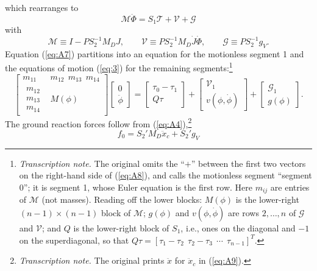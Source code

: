 \documentclass[11pt]{article}
\newcommand{\tnote}[1]{\footnote{\textit{Transcription note.} #1}}
\begin{document}
which rearranges to
\begin{equation}
\mathcal{M}\ddot{\Phi} = S_1\mathcal{T} + \mathcal{V} + \mathcal{G}
\label{eq:A7}
\end{equation}
with
\[
\mathcal{M} \equiv I - P S_2^{-1} M_D J, \qquad
\mathcal{V} \equiv P S_2^{-1} M_D\dot{J}\dot{\Phi}, \qquad
\mathcal{G} \equiv P S_2^{-1} g_V.
\]
Equation (\ref{eq:A7}) partitions into an equation for the motionless segment
1 and the equations of motion (\ref{eq:3}) for the remaining
segments:\tnote{The original omits the ``$+$'' between the first two vectors
on the right-hand side of (\ref{eq:A8}), and calls the motionless segment
``segment 0''; it is segment 1, whose Euler equation is the first row. Here
$m_{ij}$ are entries of $\mathcal{M}$ (not masses). Reading off the lower
blocks: $M(\phi)$ is the lower-right $(n-1)\times(n-1)$ block of
$\mathcal{M}$; $g(\phi)$ and $v(\phi,\dot{\phi})$ are rows $2,\ldots,n$ of
$\mathcal{G}$ and $\mathcal{V}$; and $Q$ is the lower-right block of $S_1$,
i.e., ones on the diagonal and $-1$ on the superdiagonal, so that
$Q\tau=[\tau_1-\tau_2\ \ \tau_2-\tau_3\ \ \cdots\ \ \tau_{n-1}]^T$.}
\begin{equation}
\begin{bmatrix}
m_{11} & m_{12}\ \ m_{13}\ \ m_{14}\\
\begin{matrix}m_{12}\\ m_{13}\\ m_{14}\end{matrix} & M(\phi)
\end{bmatrix}
\begin{bmatrix}0\\ \ddot{\phi}\end{bmatrix}
= \begin{bmatrix}\tau_0 - \tau_1\\ Q\tau\end{bmatrix}
+ \begin{bmatrix}\mathcal{V}_1\\ v(\phi,\dot{\phi})\end{bmatrix}
+ \begin{bmatrix}\mathcal{G}_1\\ g(\phi)\end{bmatrix}.
\label{eq:A8}
\end{equation}
The ground reaction forces follow from (\ref{eq:A4}),\tnote{The original
prints $\ddot{x}$ for $\ddot{x}_c$ in (\ref{eq:A9}).}
\begin{equation}
f_0 = S_2' M_D\ddot{x}_c + S_2' g_V
\label{eq:A9}
\end{equation}
\end{document}
